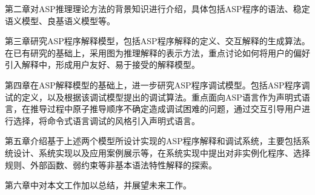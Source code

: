 第二章对ASP推理理论方法的背景知识进行介绍，具体包括ASP程序的语法、稳定语义模型、良基语义模型等。

第三章研究ASP程序解释模型，包括ASP程序解释的定义、交互解释的生成算法。在已有研究的基础上，采用图为推理解释的表示方法，重点讨论如何将用户的偏好引入解释中，形成用户友好、易于接受的解释模型。

第四章在ASP解释模型的基础上，进一步研究ASP程序调试模型。包括ASP程序调试的定义，以及根据该调试模型提出的调试算法。重点面向ASP语言作为声明式语言，在推导过程中原子推导顺序不确定造成调试困难的问题，通过交互引导用户进行选择，将命令式语言调试的风格引入声明式语言。

第五章介绍基于上述两个模型所设计实现的ASP程序解释和调试系统，主要包括系统设计、系统实现以及应用案例展示等，在系统实现中提出对非实例化程序、选择规则、外部函数、弱约束等非基本语法特性解释的探索。

第六章中对本文工作加以总结，并展望未来工作。